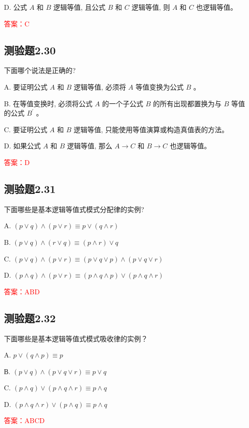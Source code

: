 \documentclass[UTF8, heading=true]{ctexart}
\begin{document}
D. 公式 $A$ 和 $B$ 逻辑等值, 且公式 $B$ 和 $C$ 逻辑等值, 则 $A$ 和 $C$ 也逻辑等值。

\textcolor{red}{答案：C}

\subsection{测验题2.30}

下面哪个说法是正确的?

A. 要证明公式 $A$ 和 $B$ 逻辑等值, 必须将 $A$ 等值变换为公式 $B$ 。

B. 在等值变换时, 必须将公式 $A$ 的一个子公式 $B$ 的所有出现都置换为与 $B$ 等值的公式 $B^{\prime}$ 。

C. 要证明公式 $A$ 和 $B$ 逻辑等值, 只能使用等值演算或构造真值表的方法。

D. 如果公式 $A$ 和 $B$ 逻辑等值, 那么 $A \rightarrow C$ 和 $B \rightarrow C$ 也逻辑等值。

\textcolor{red}{答案：D}

\subsection{测验题2.31}

下面哪些是基本逻辑等值式模式分配律的实例?

A. $(p \vee q) \wedge(p \vee r) \equiv p \vee(q \wedge r)$

B. $(p \vee q) \wedge(r \vee q) \equiv(p \wedge r) \vee q$

C. $(p \vee q) \wedge(p \vee r) \equiv(p \vee q \vee p) \wedge(p \vee q \vee r)$

D. $(p \wedge q) \wedge(p \vee r) \equiv(p \wedge q \wedge p) \vee(p \wedge q \wedge r)$

\textcolor{red}{答案：ABD}

\subsection{测验题2.32}

下面哪些是基本逻辑等值式模式吸收律的实例？

A. $p \vee(q \wedge p) \equiv p$

В. $(p \vee q) \wedge(p \vee q \vee r) \equiv p \vee q$

C. $(p \wedge q) \vee(p \wedge q \wedge r) \equiv p \wedge q$

D. $(p \wedge q \wedge r) \vee(p \wedge q) \equiv p \wedge q$

\textcolor{red}{答案：ABCD}
\end{document}
